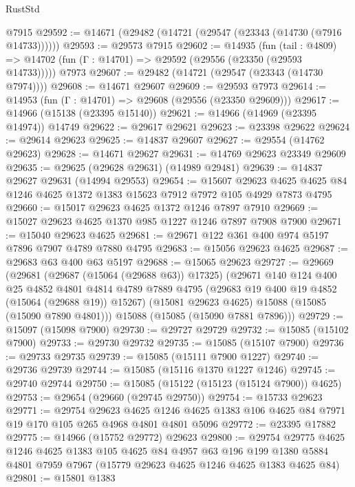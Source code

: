\begin{lexlean}{RustStd}
\begin{coremodule}
    @7915
@29592 := @14671 (@29482 (@14721 (@29547 (@23343 (@14730 (@7916 @14733))))))
@29593 := @29573 @7915
@29602 := @14935
    (fun (tail : @4809) => @14702 (fun (Γ : @14701) => @29592 (@29556 (@23350 (@29593 @14733)))))
    @7973
@29607 := @29482 (@14721 (@29547 (@23343 (@14730 @7974))))
@29608 := @14671 @29607
@29609 := @29593 @7973
@29614 := @14953 (fun (Γ : @14701) => @29608 (@29556 (@23350 @29609)))
@29617 := @14966 (@15138 (@23395 @15140))
@29621 := @14966 (@14969 (@23395 @14974)) @14749
@29622 := @29617 @29621
@29623 := @23398 @29622
@29624 := @29614 @29623
@29625 := @14837 @29607
@29627 := @29554 (@14762 @29623)
@29628 := @14671 @29627
@29631 := @14769 @29623 @23349 @29609
@29635 := @29625 (@29628 @29631) (@14989 @29481)
@29639 := @14837 @29627 @29631 (@14994 @29553)
@29654 := @15607
    @29623
    @4625
    @4625
    @84
    @1246
    @4625
    @1372
    @1383
    @15623
    @7912
    @7972
    @105
    @4929
    @7873
    @4795
@29660 := @15017 @29623 @4625 @1372 @1246 @7897 @7910
@29669 := @15027 @29623 @4625 @1370 @985 @1227 @1246 @7897 @7908 @7900
@29671 := @15040 @29623 @4625
@29681 := @29671 @122 @361 @400 @974 @5197 @7896 @7907 @4789 @7880 @4795
@29683 := @15056 @29623 @4625
@29687 := @29683 @63 @400 @63 @5197
@29688 := @15065 @29623
@29727 := @29669
    (@29681
      (@29687 (@15064 (@29688 @63)) @17325)
      (@29671
        @140
        @124
        @400
        @25
        @4852
        @4801
        @4814
        @4789
        @7889
        @4795
        (@29683 @19 @400 @19 @4852 (@15064 (@29688 @19)) @15267)
        (@15081 @29623 @4625)
        @15088
        (@15085 (@15090 @7890 @4801)))
      @15088
      (@15085 (@15090 @7881 @7896)))
@29729 := @15097 (@15098 @7900)
@29730 := @29727 @29729
@29732 := @15085 (@15102 @7900)
@29733 := @29730 @29732
@29735 := @15085 (@15107 @7900)
@29736 := @29733 @29735
@29739 := @15085 (@15111 @7900 @1227)
@29740 := @29736 @29739
@29744 := @15085 (@15116 @1370 @1227 @1246)
@29745 := @29740 @29744
@29750 := @15085 (@15122 (@15123 (@15124 @7900)) @4625)
@29753 := @29654 (@29660 (@29745 @29750))
@29754 := @15733 @29623
@29771 := @29754
    @29623
    @4625
    @1246
    @4625
    @1383
    @106
    @4625
    @84
    @7971
    @19
    @170
    @105
    @265
    @4968
    @4801
    @4801
    @5096
@29772 := @23395 @17882
@29775 := @14966 (@15752 @29772) @29623
@29800 := @29754
    @29775
    @4625
    @1246
    @4625
    @1383
    @105
    @4625
    @84
    @4957
    @63
    @196
    @199
    @1380
    @5884
    @4801
    @7959
    @7967
    (@15779 @29623 @4625 @1246 @4625 @1383 @4625 @84)
@29801 := @15801 @1383

\end{coremodule}
\end{lexlean}
